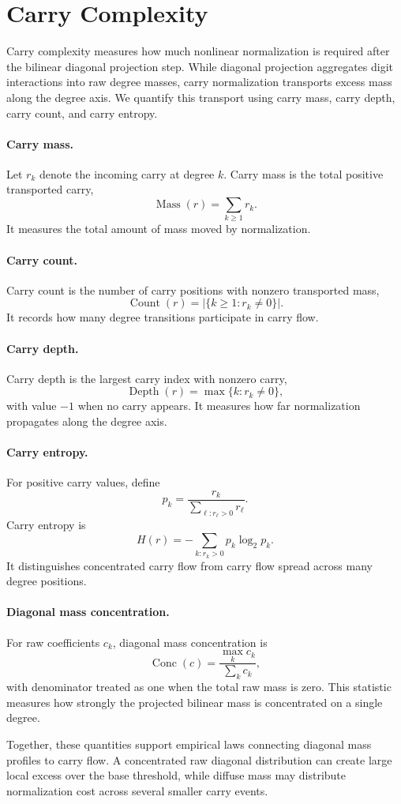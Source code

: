 \section{Carry Complexity}

Carry complexity measures how much nonlinear normalization is required after
the bilinear diagonal projection step. While diagonal projection aggregates
digit interactions into raw degree masses, carry normalization transports
excess mass along the degree axis. We quantify this transport using carry mass,
carry depth, carry count, and carry entropy.

\paragraph{Carry mass.}
Let \(r_k\) denote the incoming carry at degree \(k\). Carry mass is the total
positive transported carry,
\[
    \operatorname{Mass}(r) = \sum_{k \ge 1} r_k.
\]
It measures the total amount of mass moved by normalization.

\paragraph{Carry count.}
Carry count is the number of carry positions with nonzero transported mass,
\[
    \operatorname{Count}(r) = |\{k \ge 1 : r_k \ne 0\}|.
\]
It records how many degree transitions participate in carry flow.

\paragraph{Carry depth.}
Carry depth is the largest carry index with nonzero carry,
\[
    \operatorname{Depth}(r) = \max\{k : r_k \ne 0\},
\]
with value \(-1\) when no carry appears. It measures how far normalization
propagates along the degree axis.

\paragraph{Carry entropy.}
For positive carry values, define
\[
    p_k = \frac{r_k}{\sum_{\ell:r_\ell>0} r_\ell}.
\]
Carry entropy is
\[
    H(r) = -\sum_{k:r_k>0} p_k \log_2 p_k.
\]
It distinguishes concentrated carry flow from carry flow spread across many
degree positions.

\paragraph{Diagonal mass concentration.}
For raw coefficients \(c_k\), diagonal mass concentration is
\[
    \operatorname{Conc}(c) = \frac{\max_k c_k}{\sum_k c_k},
\]
with denominator treated as one when the total raw mass is zero. This statistic
measures how strongly the projected bilinear mass is concentrated on a single
degree.

Together, these quantities support empirical laws connecting diagonal mass
profiles to carry flow. A concentrated raw diagonal distribution can create
large local excess over the base threshold, while diffuse mass may distribute
normalization cost across several smaller carry events.
